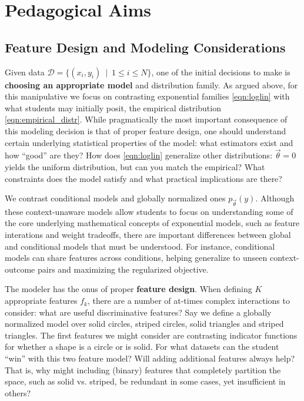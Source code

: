 \documentclass[11pt,letterpaper]{article}
\newcommand{\Data}[0]{\ensuremath{\mathcal{D}}}
\begin{document}

\section{Pedagogical Aims}\label{sec:aims}

\subsection{Feature Design and Modeling Considerations}

Given data $\Data{} = \{( x_i, y_i)\ \mid\ 1 \le i \le N\}$, one of the initial decisions 
to make is \textbf{choosing an appropriate model} and distribution family. 
As argued above, for this manipulative we focus on contrasting exponential families 
\eqref{eqn:loglin} with what students may initially posit, the empirical 
distribution \eqref{eqn:empirical_distr}. While pragmatically the most important 
consequence of this modeling decision is that of proper feature design, one should 
understand certain underlying statistical properties of the model: what estimators 
exist and how ``good'' are they? How does \eqref{eqn:loglin} generalize other 
distributions: $\vec{\theta} = 0$ yields the uniform distribution, but can you match 
the empirical? What constraints does the model satisfy and what practical implications
are there?
 
We contrast conditional models and globally normalized ones
$p_{\vec{\theta}}\left(y\right)$. Although
these context-unaware models allow students to focus on
understanding some of the core underlying mathematical concepts of
exponential models, such as feature interations and weight tradeoffs,
there are important differences between global and conditional models
that must be understood. For instance, conditional models can share 
features across conditions, helping generalize to unseen context-outcome 
pairs and maximizing the regularized objective.

The modeler has the onus of proper \textbf{feature design}. When defining $K$ 
appropriate features $f_k$, there are a number of at-times complex interactions 
to consider: what are useful discriminative features? Say we define a globally 
normalized model over solid circles, striped circles, solid triangles and striped triangles. 
The first features we might consider are contrasting indicator functions for whether a shape
is a circle or is solid. For what datasets can the student ``win'' with this two feature model? 
Will adding additional features always help? That is, why might including (binary) 
features that completely partition the space, such as solid vs. striped, be redundant in some 
cases, yet insufficient in others?
\end{document}
